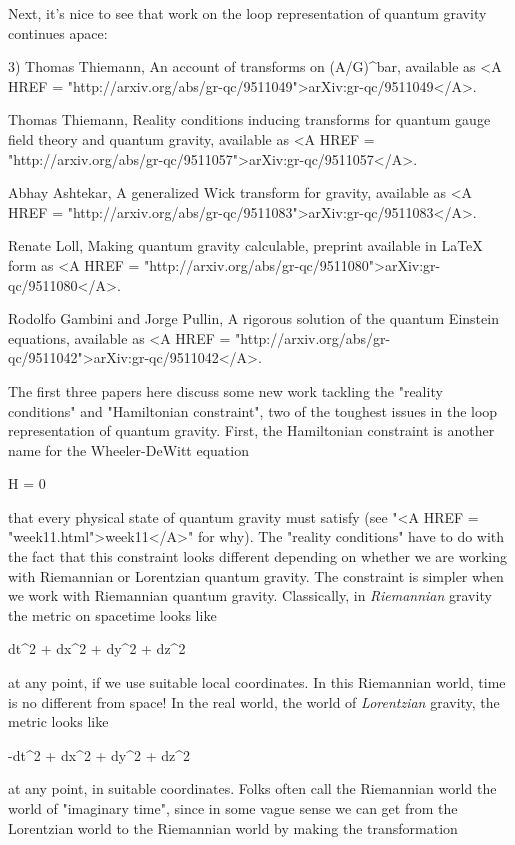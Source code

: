 Next, it's nice to see that work on the loop representation of quantum
gravity continues apace:

3) Thomas Thiemann, An account of transforms on (A/G)^bar, available
as <A HREF = "http://arxiv.org/abs/gr-qc/9511049">arXiv:gr-qc/9511049</A>.

Thomas Thiemann, Reality conditions inducing transforms for quantum
gauge field theory and quantum gravity, available 
as <A HREF = "http://arxiv.org/abs/gr-qc/9511057">arXiv:gr-qc/9511057</A>.  

Abhay Ashtekar, A generalized Wick transform for gravity, 
available as <A HREF =
"http://arxiv.org/abs/gr-qc/9511083">arXiv:gr-qc/9511083</A>.

Renate Loll, Making quantum gravity calculable, preprint available in
LaTeX form as <A HREF =
"http://arxiv.org/abs/gr-qc/9511080">arXiv:gr-qc/9511080</A>.

Rodolfo Gambini and Jorge Pullin, A rigorous solution of the quantum
Einstein equations, available as <A HREF =
"http://arxiv.org/abs/gr-qc/9511042">arXiv:gr-qc/9511042</A>.

The first three papers here discuss some new work tackling the
"reality conditions" and "Hamiltonian constraint",
two of the toughest issues in the loop representation of quantum
gravity.  First, the Hamiltonian constraint is another name for the
Wheeler-DeWitt equation

                       H \psi  = 0
 
that every physical state of quantum gravity must satisfy (see
"<A HREF = "week11.html">week11</A>" for why).  The
"reality conditions" have to do with the fact that this
constraint looks different depending on whether we are working with
Riemannian or Lorentzian quantum gravity.  The constraint is simpler
when we work with Riemannian quantum gravity.  Classically, in
\emph{Riemannian} gravity the metric on spacetime looks like
 
                dt^{2} + dx^{2} + dy^{2} + dz^{2} 

at any point, if we use suitable local coordinates.  In this Riemannian
world, time is no different from space!  In the real world, the world of
\emph{Lorentzian} gravity, the metric looks like
    
                -dt^{2} + dx^{2} + dy^{2} + dz^{2}

at any point, in suitable coordinates.  Folks often call the
Riemannian world the world of "imaginary time", since in
some vague sense we can get from the Lorentzian world to the
Riemannian world by making the transformation

